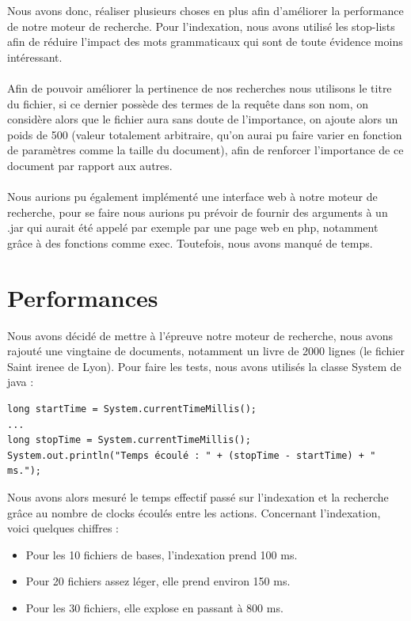 \documentclass{article}
\begin{document}
Nous avons donc, réaliser plusieurs choses en plus afin d'améliorer la performance de notre moteur de recherche. 
Pour l'indexation, nous avons utilisé les stop-lists afin de réduire l'impact des mots grammaticaux qui sont de toute évidence 
moins intéressant.\\ 
\\
Afin de pouvoir améliorer la pertinence de nos recherches nous utilisons le titre du fichier, si ce dernier possède des termes de 
la requête dans son nom, on considère alors que le fichier aura sans doute de l'importance, on ajoute alors un poids de 500 (valeur 
totalement arbitraire, qu'on aurai pu faire varier en fonction de paramètres comme la taille du document), afin de renforcer l'importance de ce 
document par rapport aux autres.\\
\\
Nous aurions pu également implémenté une interface web à notre moteur de recherche, pour se faire nous aurions pu prévoir de fournir des arguments à un .jar
qui aurait été appelé par exemple par une page web en php, notamment grâce à des fonctions comme exec. Toutefois, nous avons manqué de temps.


\section{Performances}

Nous avons décidé de mettre à l'épreuve notre moteur de recherche, nous avons rajouté une vingtaine de documents, notamment un livre de 2000 lignes (le fichier Saint irenee de Lyon). 
Pour faire les tests, nous avons utilisés la classe System de java :

\begin{lstlisting}
long startTime = System.currentTimeMillis();
...
long stopTime = System.currentTimeMillis();
System.out.println("Temps écoulé : " + (stopTime - startTime) + " ms.");
\end{lstlisting}

Nous avons alors mesuré le temps effectif passé sur l'indexation et la recherche grâce au nombre de clocks écoulés
entre les actions. Concernant l'indexation, voici quelques chiffres :
\begin{itemize}
	\item Pour les 10 fichiers de bases, l'indexation prend 100 ms.  
	\item Pour 20 fichiers assez léger, elle prend environ 150 ms. 
	\item Pour les 30 fichiers, elle explose en passant à 800 ms.
\end{itemize}
\end{document}
